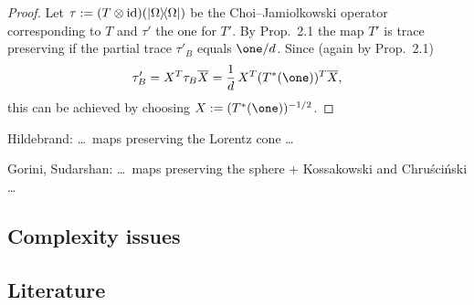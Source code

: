 \documentclass[11pt,a4paper]{article}
\numberwithin{equation}{section}
\begin{document}
\begin{proof}
    Let $\tau:=(T\otimes \mathrm{id})(|\Omega\rangle\!\langle\Omega|)$ be the Choi--Jamiolkowski operator corresponding to $T$ and $\tau'$
    the one for $T'$. By Prop.~2.1 the map $T'$ is trace preserving if the partial trace $\tau'_B$ equals $\one/d$. Since
    (again by Prop.~2.1)
    \[
        \tau'_B = X^T \tau_B \overline{X}
        = \frac{1}{d}\,X^T (T^*(\one))^T \overline{X},
    \]
    this can be achieved by choosing $X:=(T^*(\one))^{-1/2}$.
\end{proof}

Hildebrand: \dots\ maps preserving the Lorentz cone \dots

Gorini, Sudarshan: \dots\ maps preserving the sphere + Kossakowski and Chru\'sci\'nski \dots

\subsection{Complexity issues}

\subsection{Literature}
\end{document}
